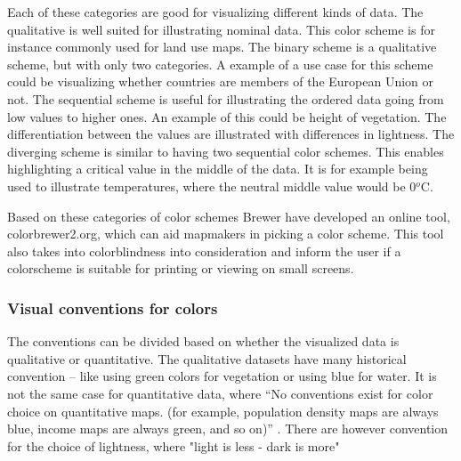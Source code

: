 Each of these categories are good for visualizing different kinds of data. The qualitative is well suited for illustrating nominal data. This color scheme is for instance commonly used for land use maps. The binary scheme is a qualitative scheme, but with only two categories. A example of a use case for this scheme could be visualizing whether countries are members of the European Union or not. 
The sequential scheme is useful for illustrating the ordered data going from low values to higher ones. An example of this could be height of vegetation. The differentiation between the values are illustrated with differences in lightness.
The diverging scheme is similar to having two sequential color schemes. This enables highlighting a critical value in the middle of the data. It is for example being used to illustrate temperatures, where the neutral middle value would be 0$^o$C. \citep{Brewer94}


Based on these categories of color schemes Brewer have developed an online tool, colorbrewer2.org, which can aid mapmakers in picking a color scheme. This tool also takes into colorblindness into consideration and inform the user if a colorscheme is suitable for printing or viewing on small screens. \citep{ColorBrewer}



\subsubsection{Visual conventions for colors}
The conventions can be divided based on whether the visualized data is qualitative or quantitative. The qualitative datasets have many historical convention – like using green colors for vegetation or using blue for water. 
It is not the same case for quantitative data, where “No conventions exist for color choice on quantitative maps. (for example, population density maps are always blue, income maps are always green, and so on)” \citep{Dent}. There are however convention for the choice of lightness, where "light is less - dark is more"

\citep{LightIsLess} %






%
%
%
%
















